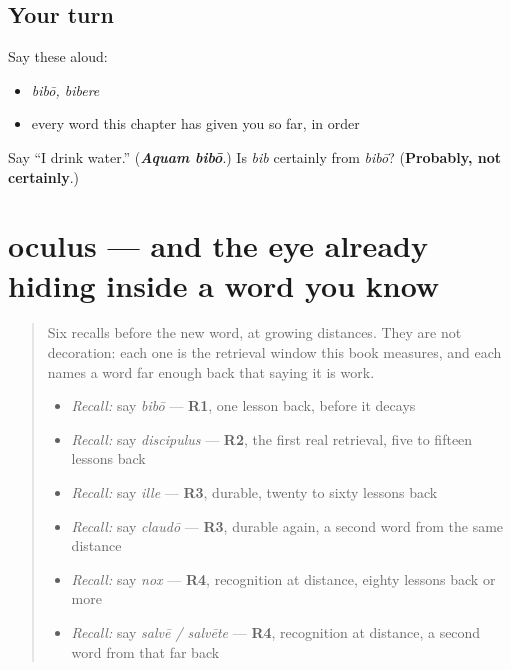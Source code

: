 \subsection*{Your turn}
Say these aloud:

\begin{itemize}
\raggedright
  \item \emph{bibō, bibere}
  \item every word this chapter has given you so far, in order
\end{itemize}

\begin{tcolorbox}[breakable,colback=teal!4,colframe=teal!35!black,title={Before you move on}]
Say \textquotedblleft{}I drink water.\textquotedblright{} (\emph{\textbf{Aquam bibō}}.) Is \emph{bib} certainly from \emph{bibō}? (\textbf{Probably, not certainly}.)
\end{tcolorbox}
\section[oculus, oculī]{oculus — and the eye already hiding inside a word you know}

\label{lesson:LA-C54-oculus}



\begin{quote}
Six recalls before the new word, at growing distances. They are not decoration: each one is the retrieval window this book measures, and each names a word far enough back that saying it is work.

\begin{itemize}
\raggedright
  \item \emph{Recall:} say \emph{bibō} — \textbf{R1}, one lesson back, before it decays
  \item \emph{Recall:} say \emph{discipulus} — \textbf{R2}, the first real retrieval, five to fifteen lessons back
  \item \emph{Recall:} say \emph{ille} — \textbf{R3}, durable, twenty to sixty lessons back
  \item \emph{Recall:} say \emph{claudō} — \textbf{R3}, durable again, a second word from the same distance
  \item \emph{Recall:} say \emph{nox} — \textbf{R4}, recognition at distance, eighty lessons back or more
  \item \emph{Recall:} say \emph{salvē / salvēte} — \textbf{R4}, recognition at distance, a second word from that far back
\end{itemize}
\end{quote}

